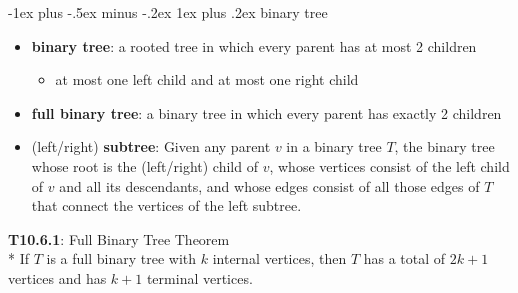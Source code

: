 \documentclass[10pt, landscape]{article}
\makeatletter
\renewcommand{\subsubsection}{\@startsection{subsubsection}{3}{0mm}%
                                {-1ex plus -.5ex minus -.2ex}%
                                {1ex plus .2ex}%
                                {\normalfont\small\bfseries}}%
\makeatother
\begin{document}
\begin{multicols}{4}
\subsubsection{binary tree}
\begin{itemize}
    \item \textbf{binary tree}: a rooted tree in which every parent has at most 2 children
    \begin{itemize}
        \item at most one left child and at most one right child
    \end{itemize}
    \item \textbf{full binary tree}: a binary tree in which every parent has exactly 2 children
    \item (left/right) \textbf{subtree}: Given any parent $v$ in a binary tree $T$, 
        the binary tree whose root is the (left/right) child of $v$, whose vertices consist of the left child of $v$ and all its descendants, 
        and whose edges consist of all those edges of $T$ that connect the vertices of the left subtree.
\end{itemize}
\begin{center}
    \textbf{T10.6.1}: Full Binary Tree Theorem
    \\* If $T$ is a full binary tree with $k$ internal vertices, then $T$ has a total of $2k + 1$ vertices and has $k+1$ terminal vertices.
\end{center}


\end{multicols}
\end{document}
